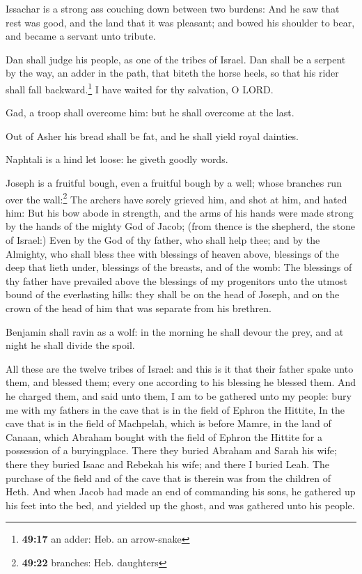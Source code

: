  Issachar is a strong ass couching down between two
burdens:  And he saw that rest was good, and the land
that it was pleasant; and bowed his shoulder to bear, and became a
servant unto tribute.

 Dan shall judge his people, as one of the tribes of
Israel.  Dan shall be a serpent by the way, an adder in
the path, that biteth the horse heels, so that his rider shall fall
backward.\footnote{\textbf{49:17} an adder: Heb. an arrow-snake}
 I have waited for thy salvation, O LORD.

 Gad, a troop shall overcome him: but he shall overcome
at the last.

 Out of Asher his bread shall be fat, and he shall yield
royal dainties.

 Naphtali is a hind let loose: he giveth goodly words.

 Joseph is a fruitful bough, even a fruitful bough by a
well; whose branches run over the wall:\footnote{\textbf{49:22}
  branches: Heb. daughters}  The archers have sorely
grieved him, and shot at him, and hated him:  But his bow
abode in strength, and the arms of his hands were made strong by the
hands of the mighty God of Jacob; (from thence is the shepherd, the
stone of Israel:)  Even by the God of thy father, who
shall help thee; and by the Almighty, who shall bless thee with
blessings of heaven above, blessings of the deep that lieth under,
blessings of the breasts, and of the womb:  The blessings
of thy father have prevailed above the blessings of my progenitors unto
the utmost bound of the everlasting hills: they shall be on the head of
Joseph, and on the crown of the head of him that was separate from his
brethren.

 Benjamin shall ravin as a wolf: in the morning he shall
devour the prey, and at night he shall divide the spoil.

 All these are the twelve tribes of Israel: and this is
it that their father spake unto them, and blessed them; every one
according to his blessing he blessed them.  And he
charged them, and said unto them, I am to be gathered unto my people:
bury me with my fathers in the cave that is in the field of Ephron the
Hittite,  In the cave that is in the field of Machpelah,
which is before Mamre, in the land of Canaan, which Abraham bought with
the field of Ephron the Hittite for a possession of a buryingplace.
 There they buried Abraham and Sarah his wife; there they
buried Isaac and Rebekah his wife; and there I buried Leah.
 The purchase of the field and of the cave that is
therein was from the children of Heth.  And when Jacob
had made an end of commanding his sons, he gathered up his feet into the
bed, and yielded up the ghost, and was gathered unto his people.

